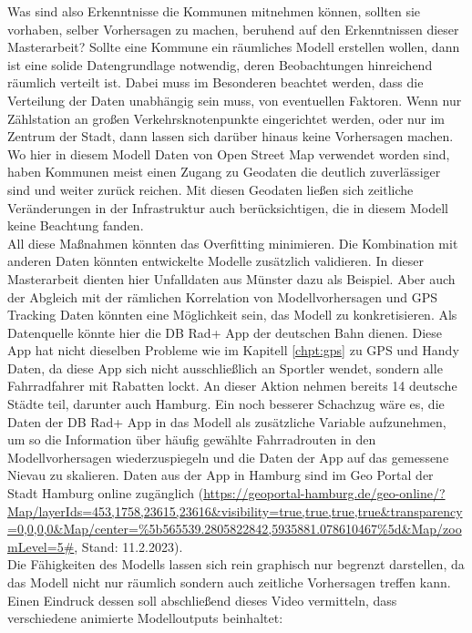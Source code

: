 \documentclass[a4paper,12pt]{thesis}
\begin{document}
Was sind also Erkenntnisse die Kommunen mitnehmen können, sollten sie vorhaben, selber Vorhersagen zu machen, beruhend auf den Erkenntnissen dieser Masterarbeit? Sollte eine Kommune ein räumliches Modell erstellen wollen, dann ist eine solide Datengrundlage notwendig, deren Beobachtungen hinreichend räumlich verteilt ist. Dabei muss im Besonderen beachtet werden, dass die Verteilung der Daten unabhängig sein muss, von eventuellen Faktoren. Wenn nur Zählstation an großen Verkehrsknotenpunkte eingerichtet werden, oder nur im Zentrum der Stadt, dann lassen sich darüber hinaus keine Vorhersagen machen. Wo hier in diesem Modell Daten von Open Street Map verwendet worden sind, haben Kommunen meist einen Zugang zu Geodaten die deutlich zuverlässiger sind und weiter zurück reichen. Mit diesen Geodaten ließen sich zeitliche Veränderungen in der Infrastruktur auch berücksichtigen, die in diesem Modell keine Beachtung fanden.\\
All diese Maßnahmen könnten das Overfitting minimieren. Die Kombination mit anderen Daten könnten entwickelte Modelle zusätzlich validieren. In dieser Masterarbeit dienten hier Unfalldaten aus Münster dazu als Beispiel. Aber auch der Abgleich mit der rämlichen Korrelation von Modellvorhersagen und GPS Tracking Daten könnten eine Möglichkeit sein, das Modell zu konkretisieren. Als Datenquelle könnte hier die DB Rad+ App der deutschen Bahn dienen. Diese App hat nicht dieselben Probleme wie im Kapitell \ref{chpt:gps} zu GPS und Handy Daten, da diese App sich nicht ausschließlich an Sportler wendet, sondern alle Fahrradfahrer mit Rabatten lockt. An dieser Aktion nehmen bereits 14 deutsche Städte teil, darunter auch Hamburg. Ein noch besserer Schachzug wäre es, die Daten der DB Rad+ App in das Modell als zusätzliche Variable aufzunehmen, um so die Information über häufig gewählte Fahrradrouten in den Modellvorhersagen wiederzuspiegeln und die Daten der App auf das gemessene Nievau zu skalieren. Daten aus der App in Hamburg sind im Geo Portal der Stadt Hamburg online zugänglich  (\url{https://geoportal-hamburg.de/geo-online/?Map/layerIds=453,1758,23615,23616&visibility=true,true,true,true&transparency=0,0,0,0&Map/center=%5b565539.2805822842,5935881.078610467%5d&Map/zoomLevel=5#}, Stand: 11.2.2023).\\

Die Fähigkeiten des Modells lassen sich rein graphisch nur begrenzt darstellen, da das Modell nicht nur räumlich sondern auch zeitliche Vorhersagen treffen kann. Einen Eindruck dessen soll abschließend dieses Video vermitteln, dass verschiedene animierte Modelloutputs beinhaltet:
\end{document}
